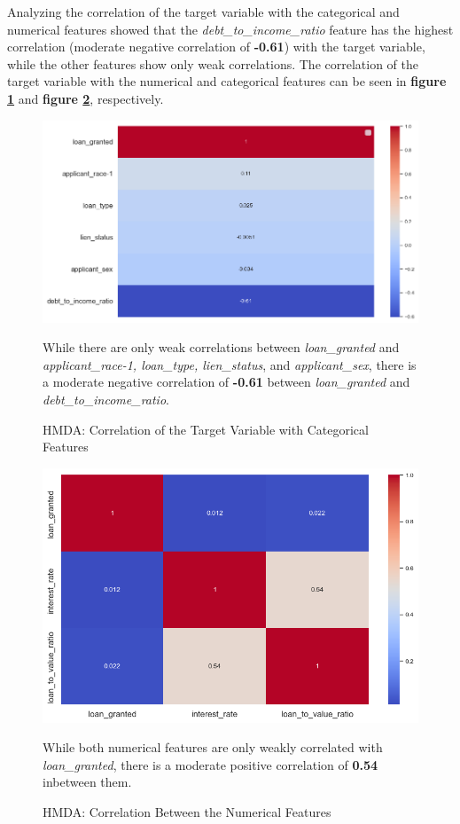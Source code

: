 Analyzing the correlation of the target variable with the categorical and numerical features showed that the \textit{debt\_to\_income\_ratio} feature has the highest correlation (moderate negative correlation of \textbf{-0.61}) with the target variable, while the other features show only weak correlations. 
The correlation of the target variable with the numerical and categorical features can be seen in \textbf{figure \ref{fig:CHXX_Target_Correlation_Categorical}} and \textbf{figure \ref{fig:CHXX_Target_Correlation_Numerical}}, respectively.

\begin{figure}[hbt!]
    \centering
    \includegraphics[width=1\textwidth]{images/CHXX_Target_Correlation_Categorical.png}
    \caption{HMDA: Correlation of the Target Variable with Categorical Features}
    \medskip
    \small
    While there are only weak correlations between \textit{loan\_granted} and \textit{applicant\_race-1, loan\_type, lien\_status}, and \textit{applicant\_sex}, there is a moderate negative correlation of \textbf{-0.61} between \textit{loan\_granted} and \textit{debt\_to\_income\_ratio}.
    \label{fig:CHXX_Target_Correlation_Categorical}
\end{figure}

\begin{figure}[hbt!]
    \centering
    \includegraphics[width=1\textwidth]{images/CHXX_Target_Correlation_Numerical.png}
    \caption{HMDA: Correlation Between the Numerical Features}
    \medskip
    \small
    While both numerical features are only weakly correlated with \textit{loan\_granted}, there is a moderate positive correlation of \textbf{0.54} inbetween them.
    \label{fig:CHXX_Target_Correlation_Numerical}
\end{figure}

